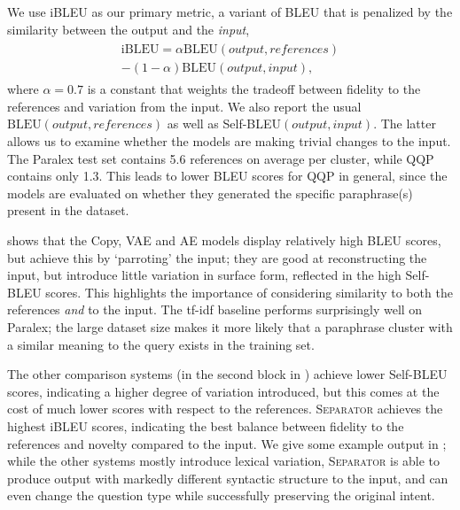 \documentclass[11pt,a4paper]{article}
\begin{document}
We use iBLEU \cite{ibleu} as our primary metric, a variant of BLEU
\cite{papineni-etal-2002-bleu,post-2018-call} that is penalized by the
similarity between the output and the \textit{input}, 
\begin{align}
\begin{split}
    \textrm{iBLEU} = \alpha \textrm{BLEU}(output, references) \\- (1-\alpha) \textrm{BLEU}(output, input),
\end{split}
\end{align}
where $\alpha = 0.7$ is a constant that weights the tradeoff between
fidelity to the references and variation from the input. We also
report the usual $\textrm{BLEU}(output, references)$ as well as
\mbox{Self-{BLEU}}$(output, input)$. The latter allows us to examine
whether the models are making trivial changes to the input. The Paralex
test set contains 5.6 references on average per cluster, while QQP
contains only 1.3. This leads to lower BLEU scores for QQP in general,
since the models are evaluated on whether they generated the
specific paraphrase(s) present in the dataset.












 shows that the Copy, VAE and AE models display
relatively high BLEU scores, but achieve this by `parroting' the
input; they are good at reconstructing the input, but introduce little
variation in surface form, reflected in the high Self-BLEU
scores. This highlights the importance of considering similarity to
both the references \textit{and} to the input.  The \mbox{tf-idf}
baseline performs surprisingly well on Paralex; the large dataset size makes it more likely that a paraphrase cluster with a similar meaning to the query exists in the training set.  

The other comparison
systems (in the second block in ) achieve lower Self-BLEU
scores, indicating a higher degree of variation introduced, but this
comes at the cost of much lower scores with respect to the
references. \textsc{Separator} achieves the highest iBLEU scores,
indicating the best balance between fidelity to the references and
novelty compared to the input. We give some example output in
; while the other systems mostly introduce lexical
variation, \textsc{Separator} is able to produce output with markedly different syntactic structure to the input, and can even
change the question type while successfully preserving the original intent.
\end{document}
